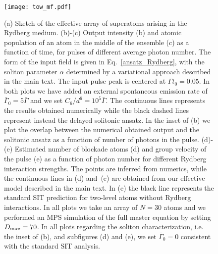 \documentclass[pra,twocolumn,showpacs,preprintnumbers,amsmath,amssymb]{revtex4-1}
\begin{document}
\begin{figure}[h]
\texttt{[image: tow\_mf.pdf]}%
\caption{(a) Sketch of the effective array of superatoms arising in the Rydberg medium. (b)-(c) Output intensity (b) and  atomic population of an atom in the middle of the ensemble (c) as a function of time, for pulses of different average photon number. The form of the input field is given in Eq.~\eqref{ansatz_Rydberg},  with the soliton parameter $\alpha$ determined by a variational approach described in the main text. The input pulse peak is centered at $\bar\Gamma t_0=0.05$. In both plots we have added an external spontaneous emission rate of $\bar\Gamma_0=5\bar\Gamma$ and we set $C_6/d^6=10^5\bar\Gamma$. The continuous lines represents the results obtained numerically while the black dashed lines represent instead the delayed solitonic ansatz. In the inset of (b) we plot the overlap between the numerical obtained output and the solitonic ansatz as a function of  number of photons in the pulse.  (d)-(e) Estimated number of blockade atoms (d)  and  group velocity of the pulse (e) as a function of photon number for different Rydberg interaction strengths. The points are inferred from numerics, while the continuous lines in (d) and~(e) are obtained from our effective model described in the main text. In (e) the black line represents the standard SIT prediction for two-level atoms without Rydberg interactions. 
In all plots we take an array of $N=30$ atoms and we performed an MPS simulation of the full master equation by setting $D_{\rm max}=70$. 
In all plots regarding the soliton characterization, i.e. the inset of (b), and subfigures (d) and (e), we set $\bar\Gamma_0=0$ consistent with the standard SIT analysis.}
\label{Fig.tow_mf}
\end{figure}
\end{document}
